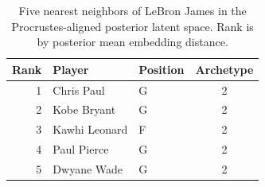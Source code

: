 \begin{table}[htbp]
  \centering\small
  \begin{tabular}{rllc}
    \toprule
    Rank & Player & Position & Archetype \\
    \midrule
    1 & Chris Paul & G & 2 \\
    2 & Kobe Bryant & G & 2 \\
    3 & Kawhi Leonard & F & 2 \\
    4 & Paul Pierce & G & 2 \\
    5 & Dwyane Wade & G & 2 \\
    \bottomrule
  \end{tabular}
  \caption{Five nearest neighbors of LeBron James in the Procrustes-aligned posterior latent space. Rank is by posterior mean embedding distance.}
\end{table}

